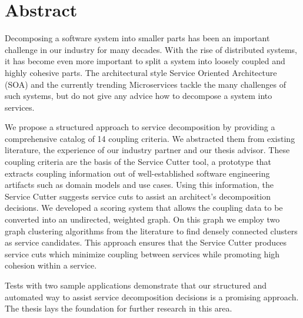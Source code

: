 \chapter{Abstract}

Decomposing a software system into smaller parts has been an important challenge in our industry for many decades. With the rise of distributed systems, it has become even more important to split a system into loosely coupled and highly cohesive parts. The architectural style Service Oriented Architecture (SOA) and the currently trending Microservices tackle the many challenges of such systems, but do not give any advice how to decompose a system into services.

We propose a structured approach to service decomposition by providing a comprehensive catalog of 14 coupling criteria. We abstracted them from existing literature, the experience of our industry partner and our thesis advisor. These coupling criteria are the basis of the Service Cutter tool, a prototype that extracts coupling information out of well-established software engineering artifacts such as domain models and use cases. Using this information, the Service Cutter suggests service cuts to assist an architect’s decomposition decisions. We developed a scoring system that allows the coupling data to be converted into an undirected, weighted graph. On this graph we employ two graph clustering algorithms from the literature to find densely connected clusters as service candidates. This approach ensures that the Service Cutter produces service cuts which minimize coupling between services while promoting high cohesion within a service.

Tests with two sample applications demonstrate that our structured and automated way to assist service decomposition decisions is a promising approach. The thesis lays the foundation for further research in this area.